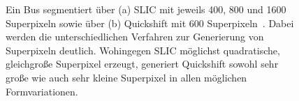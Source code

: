 \begin{figure}[t]
\centering
{}
\caption[\gls{SLIC} und Quickshift Beispielresultat]{Ein Bus segmentiert über (a) \gls{SLIC} mit jeweils 400, 800 und 1600 Superpixeln sowie über (b) Quickshift mit 600 Superpixeln~\cite{pascal_voc}.
Dabei werden die unterschiedlichen Verfahren zur Generierung von Superpixeln deutlich.
Wohingegen \gls{SLIC} möglichst quadratische, gleichgroße Superpixel erzeugt, generiert Quickshift sowohl sehr große wie auch sehr kleine Superpixel in allen möglichen Formvariationen.}
\label{fig:slic_quickshift}
\end{figure}
